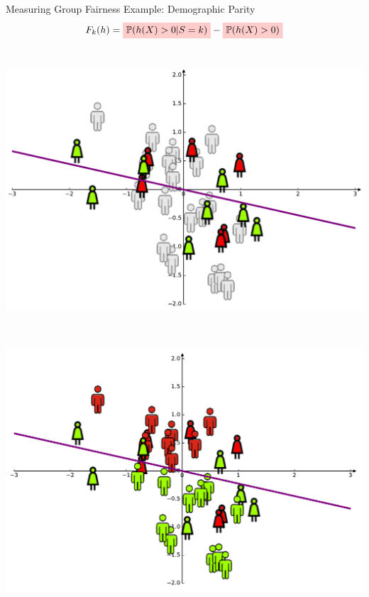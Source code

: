 \documentclass[aspectratio=169,14pt]{beamer}
\begin{document}
\begin{frame}{Measuring Group Fairness}
  Example: Demographic Parity
  \begin{align*}
    F_k(h) =
    \tikz[baseline,remember picture]{\node[fill=red!20,anchor=base]
    (shirtprob){$\displaystyle \prob( h(X) > 0 | S = k)$};}
    -
    \tikz[baseline,remember picture]{\node[fill=red!20,anchor=base]
    (baseprob){$\displaystyle \prob( h(X) > 0 ) $};}    
  \end{align*}
  ~~~~~~~~~~~~~~~~~~~~~
  \begin{minipage}{0.3\linewidth}
    \includegraphics[width=\textwidth]{images/dataset-dress.png}
  \end{minipage}%
  ~~
  \begin{minipage}{0.3\linewidth}
    \includegraphics[width=\textwidth]{images/dataset-fairness.png}
  \end{minipage}%

  \vspace{1em}

\end{frame}
\end{document}
